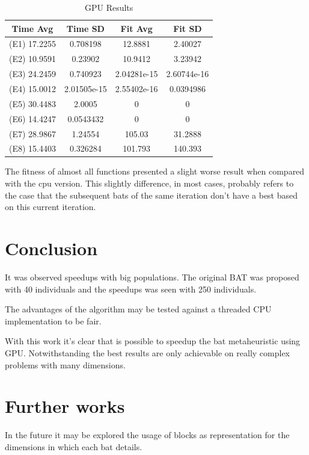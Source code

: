 \documentclass[conference]{IEEEtran}
\begin{document}
\begin{table}[!t]
    \renewcommand{\arraystretch}{1.3}
    \caption{GPU Results}
    \label{results}
    \centering
    \begin{tabular}{c|c|c|c}
    \hline
        Time Avg & Time SD & Fit Avg & Fit SD\\
    \hline
        (E1) 17.2255  & 0.708198 &  12.8881 & 2.40027 \\
        (E2) 10.9591  & 0.23902 & 10.9412 & 3.23942 \\
        (E3) 24.2459  & 0.740923  & 2.04281e-15 & 2.60744e-16 \\
        (E4) 15.0012 & 2.01505e-15 & 2.55402e-16 & 0.0394986 \\
        (E5) 30.4483  & 2.0005    & 0 & 0 \\
        (E6) 14.4247 & 0.0543432 & 0 & 0 \\
        (E7) 28.9867 & 1.24554 & 105.03 & 31.2888 \\
        (E8) 15.4403 & 0.326284 & 101.793 & 140.393 \\
    \end{tabular}
\end{table}

The fitness of almost all functions presented a slight worse result when compared with the cpu version.
This slightly difference, in most cases, probably refers to the case
that the subsequent bats of the same iteration don't have a best based
on this current iteration.

\section{Conclusion}

It was observed speedups with big populations. The original BAT was
proposed with 40 individuals and the speedups was seen with 250
individuals.

The advantages of the algorithm may be tested against a threaded CPU
implementation to be fair.

With this work it's clear that is possible to speedup the bat
metaheuristic using GPU. Notwithstanding the best results are only
achievable on really complex problems with many dimensions.

\section{Further works}

In the future it may be explored the usage of blocks as representation
for the dimensions in which each bat details.
\end{document}
